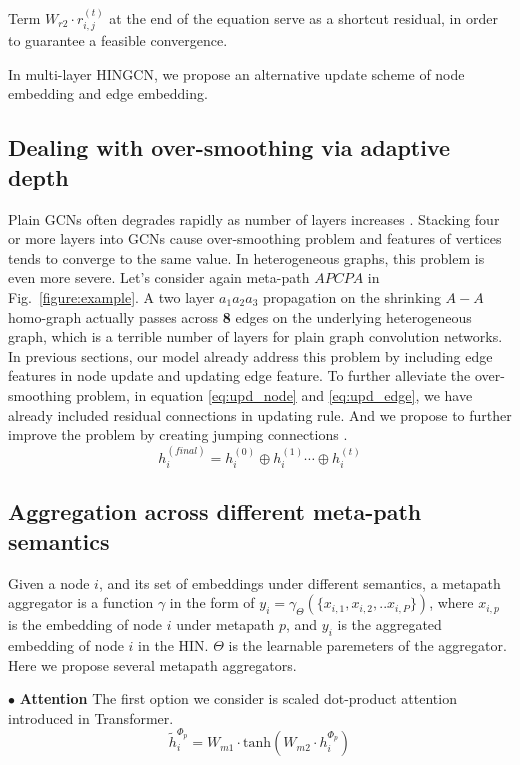 Term $W_{r2}\cdot r^{(t)}_{i,j}$ at the end of the equation serve as a shortcut residual, in order to guarantee a feasible convergence.

In multi-layer HINGCN, we propose an alternative update scheme of node embedding and edge embedding. 
\subsection{Dealing with over-smoothing via adaptive depth}
Plain GCNs often degrades rapidly as number of layers increases \cite{LiHW18,abs-1904-03751}. Stacking four or more layers into GCNs cause over-smoothing problem and features of vertices tends to converge to the same value. In heterogeneous graphs, this problem is even more severe. Let's consider again meta-path $APCPA$ in Fig.~\ref{figure:example}. A two layer $a_1 a_2 a_3$ propagation on the shrinking $A-A$ homo-graph actually passes across \textbf{8} edges on the underlying heterogeneous graph, which is a terrible number of layers for plain graph convolution networks.
In previous sections, our model already address this problem by including edge features in node update and updating edge feature. To further alleviate the over-smoothing problem, in equation \ref{eq:upd_node} and \ref{eq:upd_edge}, we have already included residual connections \cite{HeZRS16} in updating rule. And we propose to further improve the problem by creating jumping connections \cite{XuLTSKJ18}.
\begin{equation}
\label{eq:jump}
h^{(final)}_i = h^{(0)}_i \oplus h^{(1)}_i \cdots \oplus h^{(t)}_i
\end{equation} 

\subsection{Aggregation across different meta-path semantics}
\label{sec:mp_aggr}
Given a node $i$, and its set of embeddings under different semantics, a metapath aggregator is a function $\gamma$ in the form of $y_i = \gamma_\Theta(\{x_{i,1},x_{i,2},..x_{i,P}\})$, where $x_{i,p}$ is the embedding of node $i$ under metapath $p$, and $y_i$ is the aggregated embedding of node $i$ in the HIN. $\Theta$ is the learnable paremeters of the aggregator.
Here we propose several metapath aggregators. 

$\bullet$ \textbf{Attention}
 The first option we consider is scaled dot-product attention introduced in Transformer. 
\begin{equation}
\label{eq:mp_mlp}
\tilde{h}^{\Phi_p}_i = W_{m1} \cdot \text{tanh}(W_{m2} \cdot h^{\Phi_p}_i)
\end{equation}

